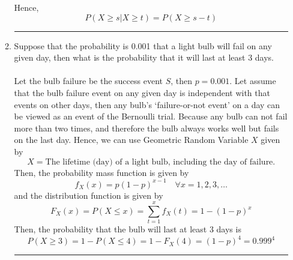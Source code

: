 \documentclass[twoside]{article}
\theoremstyle{definition}
\theoremstyle{remark}
\newenvironment{sol}{{\bf Solution:}}{\hfill\rule{2mm}{2mm}}
\begin{document}
\begin{enumerate}
\begin{enumerate}
\begin{sol}
\begin{equation}
      \end{equation}
      Hence,
      \begin{equation}
        P(X \geq s | X \geq t) = P(X \geq s-t)
      \end{equation}
    \end{sol}
    \item Suppose that the probability is 0.001 that a light bulb will fail on any
    given day, then what is the probability that it will last at least 3 days.\\
    \begin{sol}\\
      Let the bulb failure be the success event $S$, then $p = 0.001$. Let assume
      that the bulb failure event on any given day is independent with that events
      on other days, then any bulb's `failure-or-not event' on a day can be viewed
      as an event of the Bernoulli trial. Because any bulb can not fail more than
      two times, and therefore the bulb always works well but fails on the last
      day. Hence, we can use Geometric Random Variable $X$ given by
      \begin{equation}
        X = \textrm{The lifetime (day) of a light bulb, including the day of failure.}
      \end{equation}
      Then, the probability mass function is given by
      \begin{equation}
        f_X(x) = p {(1-p)}^{x-1} \quad \forall x = 1, 2, 3, \ldots
      \end{equation}
      and the distribution function is given by
      \begin{equation}
        F_X(x) = P(X \leq x) = \sum_{t=1}^{x} f_X(t) = 1-(1-p)^x
      \end{equation}
      Then, the probability that the bulb will last at least 3 days is
      \begin{equation}
        P(X \geq 3) = 1 - P(X \leq 4) = 1 - F_X(4) = {(1-p)}^4 = 0.999^4
      \end{equation}
    \end{sol}
  \end{enumerate}


\end{enumerate}
\end{document}
